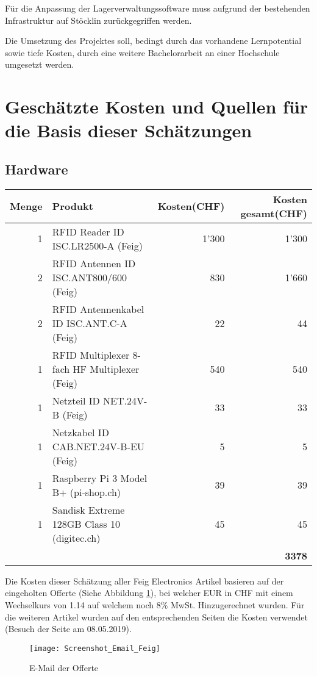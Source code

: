 Für die Anpassung der Lagerverwaltungssoftware muss aufgrund der bestehenden Infrastruktur auf Stöcklin zurückgegriffen werden.

Die Umsetzung des Projektes soll, bedingt durch das vorhandene Lernpotential sowie tiefe Kosten, durch eine weitere Bachelorarbeit an einer Hochschule umgesetzt werden.

\section{Geschätzte Kosten und Quellen für die Basis dieser Schätzungen}
\subsection{Hardware}
\begin{tabularx}{\textwidth}{|r|X|r|r|}
	\hline
	\textbf{Menge} & \textbf{Produkt} & \textbf{Kosten(CHF)} & \textbf{Kosten gesamt(CHF)} \\
	\hline
	1 & RFID Reader ID ISC.LR2500-A (Feig) & 1'300 & 1'300 \\
	\hline
	2 & RFID Antennen ID ISC.ANT800/600 (Feig)& 830 & 1'660 \\
	\hline
	2 & RFID Antennenkabel ID ISC.ANT.C-A (Feig) & 22 & 44 \\
	\hline
	1 & RFID Multiplexer 8-fach HF Multiplexer (Feig) & 540 & 540 \\
	\hline
	1 & Netzteil ID NET.24V-B (Feig) & 33 & 33 \\
	\hline
	1 & Netzkabel ID CAB.NET.24V-B-EU (Feig) & 5 & 5 \\
	\hline
	1 & Raspberry Pi 3 Model B+ (pi-shop.ch)& 39 & 39 \\
	\hline
	1 & Sandisk Extreme 128GB Class 10 (digitec.ch)& 45 & 45 \\
	\hline
	& & & \textbf{3378} \\
	\hline
\end{tabularx}

Die Kosten dieser Schätzung aller Feig Electronics Artikel basieren auf der eingeholten Offerte (Siehe Abbildung \ref{fig:offerteFeig}), bei welcher EUR in CHF mit einem Wechselkurs von 1.14 auf welchem noch 8\% MwSt. Hinzugerechnet wurden.
Für die weiteren Artikel wurden auf den entsprechenden Seiten die Kosten verwendet (Besuch der Seite am 08.05.2019).

\begin{figure}[h!]
	\centering
	\texttt{[image: Screenshot\_Email\_Feig]}
	\caption{E-Mail der Offerte}
	\label{fig:offerteFeig}
\end{figure}


